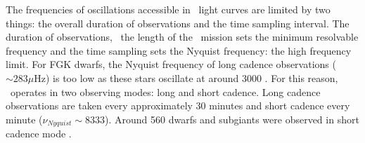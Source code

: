 
The frequencies of oscillations accessible in \kepler\ light curves are
limited by two things: the overall duration of observations and the time
sampling interval.
The duration of observations, \ie\ the length of the \kepler\ mission sets the
minimum resolvable frequency and the time sampling sets the Nyquist frequency:
the high frequency limit.
For FGK dwarfs, the Nyquist frequency of long cadence observations ($\sim 283
\mu$Hz) is too low as these stars oscillate at around 3000 \uHz.
For this reason, \kepler\ operates in two observing modes: long and short
cadence.
Long cadence observations are taken every approximately 30 minutes and short
cadence every minute ($\nu_{Nyquist} \sim 8333$\uHz).
Around 560 dwarfs and subgiants were observed in short cadence mode
\citep{Chaplin2014}.

